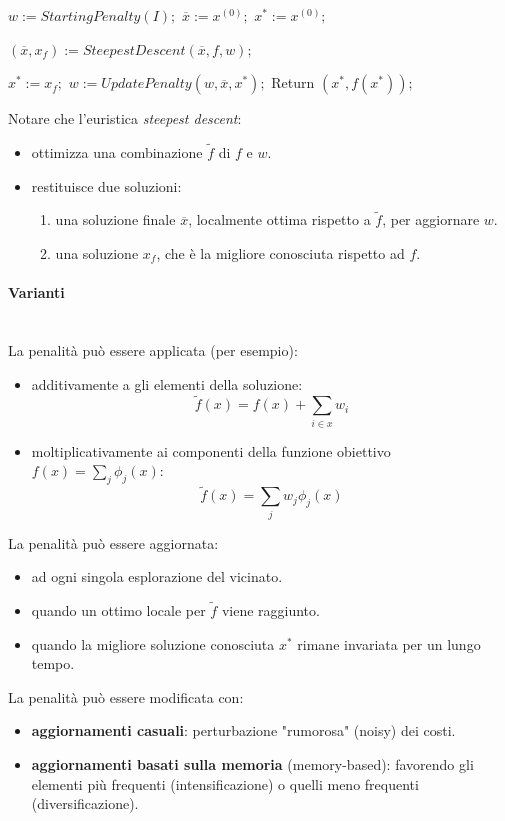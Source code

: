 \documentclass{article}
\begin{document}
\begin{algorithm}[H]
    \caption{$DyamicLocalSearch(I,x^{(0)})$}
    \label{alg:vnd}
    \begin{algorithmic}
        \State $w:= StartingPenalty(I);$
        \State $\overline{x}:=x^{(0)};$
        \State $x^*:=x^{(0)};$

            \State $(\overline{x},x_f):=SteepestDescent(\overline{x},f,w);$

                \State $x^*:=x_f;$
            \EndIf
                \State $w:=UpdatePenalty(w,\overline{x},x^*);$
            \EndWhile
        \State Return $(x^*,f(x^*));$

    \end{algorithmic}
\end{algorithm}

Notare che l'euristica \textit{steepest descent}:
\begin{itemize}
    \item ottimizza una combinazione $\tilde{f}$ di $f$ e $w$.
    \item restituisce due soluzioni:
    \begin{enumerate}
        \item una soluzione finale $\overline{x}$, localmente ottima rispetto a $\tilde{f}$,
        per aggiornare $w$.
        \item una soluzione $x_f$, che è la migliore conosciuta rispetto ad $f$.
    \end{enumerate}
\end{itemize}

\paragraph{Varianti}\mbox{}\\
La penalità può essere applicata (per esempio):
\begin{itemize}
    \item additivamente a gli elementi della soluzione:
    $$\tilde{f}(x)=f(x)+\sum_{i\in x}w_i$$
    \item moltiplicativamente ai componenti della funzione obiettivo $f(x)=\sum_j \phi_j(x)$:
    $$\tilde{f}(x)=\sum_j w_j\phi_j (x)$$
\end{itemize}
La penalità può essere aggiornata:
\begin{itemize}
    \item ad ogni singola esplorazione del vicinato.
    \item quando un ottimo locale per $\tilde{f}$ viene raggiunto.
    \item quando la migliore soluzione conosciuta $x^*$ rimane invariata per un lungo tempo.
\end{itemize}
La penalità può essere modificata con:
\begin{itemize}
    \item \textbf{aggiornamenti casuali}: perturbazione "rumorosa" (noisy) dei costi.
    \item \textbf{aggiornamenti basati sulla memoria} (memory-based): favorendo gli elementi
    più frequenti (intensificazione) o quelli meno frequenti (diversificazione).
\end{itemize}
\end{document}

